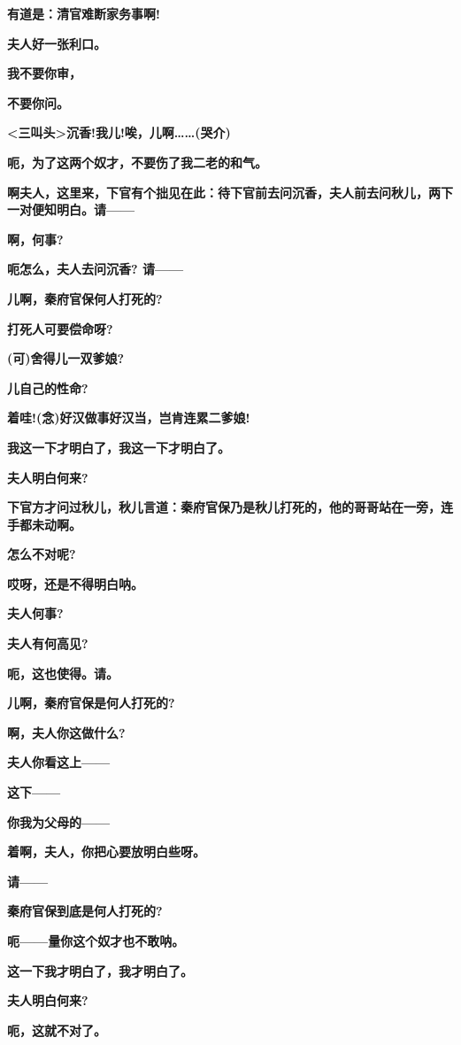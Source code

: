 \textbf{有道是：清官难断家务事啊!}

\textbf{夫人好一张利口。}

\textbf{我不要你审，}

\textbf{不要你问。}

\textbf{\textless{}三叫头\textgreater{}沉香!我儿!唉，儿啊\ldots{}\ldots{}(哭介)}

\textbf{呃，为了这两个奴才，不要伤了我二老的和气。}

\textbf{啊夫人，这里来，下官有个拙见在此：待下官前去问沉香，夫人前去问秋儿，两下一对便知明白。请------}

\textbf{啊，何事?}

\textbf{呃怎么，夫人去问沉香? 请------}

\textbf{儿啊，秦府官保何人打死的?}

\textbf{打死人可要偿命呀?}

\textbf{(可)舍得儿一双爹娘?}

\textbf{儿自己的性命?}

\textbf{着哇!(念)好汉做事好汉当，岂肯连累二爹娘!}

\textbf{我这一下才明白了，我这一下才明白了。}

\textbf{夫人明白何来?}

\textbf{下官方才问过秋儿，秋儿言道：秦府官保乃是秋儿打死的，他的哥哥站在一旁，连手都未动啊。}

\textbf{怎么不对呢?}

\textbf{哎呀，还是不得明白呐。}

\textbf{夫人何事?}

\textbf{夫人有何高见?}

\textbf{呃，这也使得。请。}

\textbf{儿啊，秦府官保是何人打死的?}

\textbf{啊，夫人你这做什么?}

\textbf{夫人你看这上------}

\textbf{这下------}

\textbf{你我为父母的------}

\textbf{着啊，夫人，你把心要放明白些呀。}

\textbf{请------}

\textbf{秦府官保到底是何人打死的?}

\textbf{呃------量你这个奴才也不敢呐。}

\textbf{这一下我才明白了，我才明白了。}

\textbf{夫人明白何来?}

\textbf{呃，这就不对了。}

